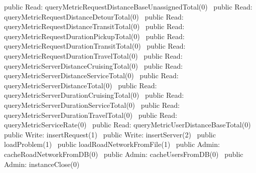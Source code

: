 public \LA{}Read: queryMetricRequestDistanceBaseUnassignedTotal(0)~{\nwtagstyle{}}\RA{}
public \LA{}Read: queryMetricRequestDistanceDetourTotal(0)~{\nwtagstyle{}}\RA{}
public \LA{}Read: queryMetricRequestDistanceTransitTotal(0)~{\nwtagstyle{}}\RA{}
public \LA{}Read: queryMetricRequestDurationPickupTotal(0)~{\nwtagstyle{}}\RA{}
public \LA{}Read: queryMetricRequestDurationTransitTotal(0)~{\nwtagstyle{}}\RA{}
public \LA{}Read: queryMetricRequestDurationTravelTotal(0)~{\nwtagstyle{}}\RA{}
public \LA{}Read: queryMetricServerDistanceCruisingTotal(0)~{\nwtagstyle{}}\RA{}
public \LA{}Read: queryMetricServerDistanceServiceTotal(0)~{\nwtagstyle{}}\RA{}
public \LA{}Read: queryMetricServerDistanceTotal(0)~{\nwtagstyle{}}\RA{}
public \LA{}Read: queryMetricServerDurationCruisingTotal(0)~{\nwtagstyle{}}\RA{}
public \LA{}Read: queryMetricServerDurationServiceTotal(0)~{\nwtagstyle{}}\RA{}
public \LA{}Read: queryMetricServerDurationTravelTotal(0)~{\nwtagstyle{}}\RA{}
public \LA{}Read: queryMetricServiceRate(0)~{\nwtagstyle{}}\RA{}
public \LA{}Read: queryMetricUserDistanceBaseTotal(0)~{\nwtagstyle{}}\RA{}
\nwendcode{}\nwdocspar
{}
\nwenddocs{}\plusendmoddef
public \LA{}Write: insertRequest(1)~{\nwtagstyle{}}\RA{}
public \LA{}Write: insertServer(2)~{\nwtagstyle{}}\RA{}
public \LA{}loadProblem(1)~{\nwtagstyle{}}\RA{}
public \LA{}loadRoadNetworkFromFile(1)~{\nwtagstyle{}}\RA{}
\nwendcode{}\nwdocspar
{}
\nwenddocs{}\plusendmoddef
public \LA{}Admin: cacheRoadNetworkFromDB(0)~{\nwtagstyle{}}\RA{}
public \LA{}Admin: cacheUsersFromDB(0)~{\nwtagstyle{}}\RA{}
public \LA{}Admin: instanceClose(0)~{\nwtagstyle{}}\RA{}
